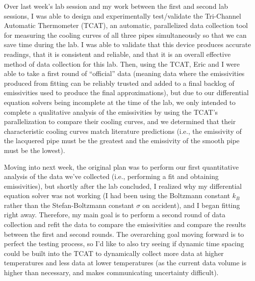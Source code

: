 \documentclass[12pt]{article}
\begin{document}
Over last week's lab session and my work between the first and second lab sessions, I was able to design and experimentally test/validate the Tri-Channel Automatic Thermometer (TCAT), an automatic, parallelized data collection tool for measuring the cooling curves of all three pipes simultaneously so that we can save time during the lab. I was able to validate that this device produces accurate readings, that it is consistent and reliable, and that it is an overall effective method of data collection for this lab. Then, using the TCAT, Eric and I were able to take a first round of ``official'' data (meaning data where the emissivities produced from fitting can be reliably trusted and added to a final backlog of emissivities used to produce the final approximations), but due to our differential equation solvers being incomplete at the time of the lab, we only intended to complete a qualitative analysis of the emissivities by using the TCAT's parallelization to compare their cooling curves, and we determined that their characteristic cooling curves match literature predictions (i.e., the emissivity of the lacquered pipe must be the greatest and the emissivity of the smooth pipe must be the lowest).

Moving into next week, the original plan was to perform our first quantitative analysis of the data we've collected (i.e., performing a fit and obtaining emissivities), but shortly after the lab concluded, I realized why my differential equation solver was not working (I had been using the Boltzmann constant $k_B$ rather than the Stefan-Boltzmann constant $\sigma$ on accident), and I began fitting right away. Therefore, my main goal is to perform a second round of data collection and refit the data to compare the emissivities and compare the results between the first and second rounds. The overarching goal moving forward is to perfect the testing process, so I'd like to also try seeing if dynamic time spacing could be built into the TCAT to dynamically collect more data at higher temperatures and less data at lower temperatures (as the current data volume is higher than necessary, and makes communicating uncertainty difficult).
\end{document}
